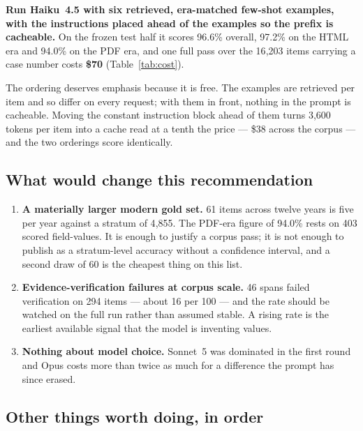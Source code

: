 \documentclass[11pt]{article}
\begin{document}
\textbf{Run Haiku~4.5 with six retrieved, era-matched few-shot examples, with the
instructions placed ahead of the examples so the prefix is cacheable.} On the frozen test
half it scores 96.6\% overall, 97.2\% on the HTML era and 94.0\% on the PDF era, and one full
pass over the 16{,}203 items carrying a case number costs \textbf{\$70}
(Table~\ref{tab:cost}).

The ordering deserves emphasis because it is free. The examples are retrieved per item and so
differ on every request; with them in front, nothing in the prompt is cacheable. Moving the
constant instruction block ahead of them turns 3{,}600 tokens per item into a cache read at a
tenth the price --- \$38 across the corpus --- and the two orderings score identically.

\subsection{What would change this recommendation}

\begin{enumerate}
\item \textbf{A materially larger modern gold set.} 61 items across twelve years is five per
year against a stratum of 4{,}855. The PDF-era figure of 94.0\% rests on 403 scored
field-values. It is enough to justify a corpus pass; it is not enough to publish as a
stratum-level accuracy without a confidence interval, and a second draw of 60 is the cheapest
thing on this list.
\item \textbf{Evidence-verification failures at corpus scale.} 46 spans failed verification
on 294 items --- about 16 per 100 --- and the rate should be watched on the full run rather
than assumed stable. A rising rate is the earliest available signal that the model is
inventing values.
\item \textbf{Nothing about model choice.} Sonnet~5 was dominated in the first round and Opus
costs more than twice as much for a difference the prompt has since erased.
\end{enumerate}

\subsection{Other things worth doing, in order}
\end{document}
